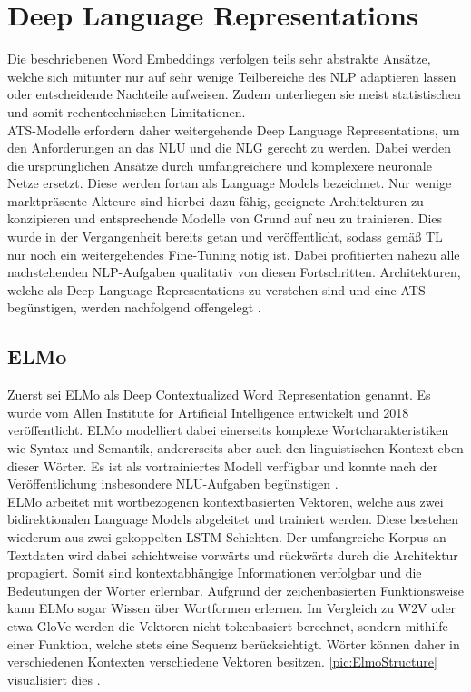 \section{Deep Language Representations}
\noindent
Die beschriebenen Word Embeddings verfolgen teils sehr abstrakte Ansätze, welche sich mitunter nur auf sehr wenige Teilbereiche des \ac{NLP} adaptieren lassen oder entscheidende Nachteile aufweisen. Zudem unterliegen sie meist statistischen und somit rechentechnischen Limitationen.\\

\noindent
\ac{ATS}-Modelle erfordern daher weitergehende Deep Language Representations, um den Anforderungen an das \ac{NLU} und die \ac{NLG} gerecht zu werden. Dabei werden die ursprünglichen Ansätze durch umfangreichere und komplexere neuronale Netze ersetzt. Diese werden fortan als Language Models bezeichnet. Nur wenige marktpräsente Akteure sind hierbei dazu fähig, geeignete Architekturen zu konzipieren und entsprechende Modelle von Grund auf neu zu trainieren. Dies wurde in der Vergangenheit bereits getan und veröffentlicht, sodass gemäß \ac{TL} nur noch ein weitergehendes Fine-Tuning nötig ist. Dabei profitierten nahezu alle nachstehenden \ac{NLP}-Aufgaben qualitativ von diesen Fortschritten. Architekturen, welche als Deep Language Representations zu verstehen sind und eine \ac{ATS} begünstigen, werden nachfolgend offengelegt \cite[S.~25]{NIT19}.


\subsection{ELMo}
\noindent
Zuerst sei \ac{ELMo} als Deep Contextualized Word Representation genannt. Es wurde vom Allen Institute for Artificial Intelligence entwickelt und 2018 veröffentlicht. \ac{ELMo} modelliert dabei einerseits komplexe Wortcharakteristiken wie Syntax und Semantik, andererseits aber auch den linguistischen Kontext eben dieser Wörter. Es ist als vortrainiertes Modell verfügbar und konnte nach der Veröffentlichung insbesondere \ac{NLU}-Aufgaben begünstigen \cite[S.~1]{PET18}.\\

\noindent
\ac{ELMo} arbeitet mit wortbezogenen kontextbasierten Vektoren, welche aus zwei bidirektionalen Language Models abgeleitet und trainiert werden. Diese bestehen wiederum aus zwei gekoppelten \ac{LSTM}-Schichten. Der umfangreiche Korpus an Textdaten wird dabei schichtweise vorwärts und rückwärts durch die Architektur propagiert. Somit sind kontextabhängige Informationen verfolgbar und die Bedeutungen der Wörter erlernbar. Aufgrund der zeichenbasierten Funktionsweise kann \ac{ELMo} sogar Wissen über Wortformen erlernen. Im Vergleich zu \ac{W2V} oder etwa \ac{GloVe} werden die Vektoren nicht tokenbasiert berechnet, sondern mithilfe einer Funktion, welche stets eine Sequenz berücksichtigt. Wörter können daher in verschiedenen Kontexten verschiedene Vektoren besitzen. \autoref{pic:ElmoStructure} visualisiert dies \cite[S.~2-3]{PET18}.

